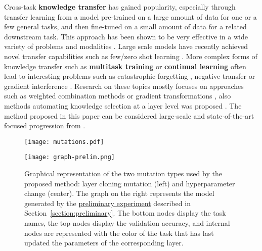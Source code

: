 \documentclass{article} \usepackage{iclr2023_conference,times}
\begin{document}
Cross-task \textbf{knowledge transfer}
has gained popularity, especially through transfer learning from a model
pre-trained on a large amount of data for one or a few general tasks,
and then fine-tuned on a small amount of data for a related downstream task.
This approach has been shown to be very effective in a wide variety of problems
and modalities \citep{Devlin2019BERTPO,Dosovitskiy2021AnII}.
Large scale models have recently achieved novel transfer capabilities such as few/zero shot learning \citep{Brown2020LanguageMA}.
More complex forms of knowledge transfer such as \textbf{multitask training} or \textbf{continual learning} often lead to interesting problems such as catastrophic forgetting \citep{McCloskey1989CatastrophicII,French1999CatastrophicFI}, negative transfer \citep{Rosenstein2005ToTO,Wang2019CharacterizingAA} or gradient interference \citep{Chen2018GradNormGN,Yu2020GradientSF}.
Research on these topics mostly focuses on approaches
such as weighted combination methods \citep{Liu2019LossBalancedTW,Sun2020ERNIE2A} or gradient transformations \citep{Sener2018MultiTaskLA,Kendall2018MultitaskLU},
also methods automating knowledge selection at a layer level was proposed \citep{Sun2020AdaShareLW}.
The method proposed in this paper can be considered large-scale and state-of-the-art focused progression from \citet{Gesmundo2022muNet1}.

\begin{figure}[t]
\vspace{-10pt}
\centering
\begin{minipage}{.67\textwidth}
  \centering
  \texttt{[image: mutations.pdf]}
\end{minipage}\begin{minipage}{.33\textwidth}
  \centering
  \texttt{[image: graph-prelim.png]}
\end{minipage}
\vspace{-6pt}
\caption{
Graphical representation of the two mutation types used
by the proposed method:
layer cloning mutation (left) and hyperparameter change (center).
The graph on the right represents the model generated by the 
\href{https://youtu.be/Pcin4hPGaOk}{preliminary experiment}
described in Section~\ref{section:preliminary}.
The bottom nodes display the task names, the top nodes display the
validation accuracy, and internal nodes are represented with the color of the task that has last updated the parameters of the corresponding layer.
}
\label{fig:mutations}
\vspace{-10pt}
\end{figure}
\end{document}

